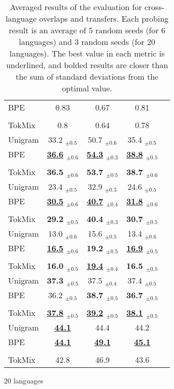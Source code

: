\begin{table*}[!htb]
\begin{subtable}[t]{.42\linewidth}
\begin{tabular}[t]{lcccc}
            BPE &              0.83 &              0.67 &              0.81 \\ \\
         TokMix &               0.8 &              0.64 &              0.78 \\
    \midrule
    Unigram &  33.2 $_{\pm0.5}$ &  50.7 $_{\pm0.6}$ &  35.4 $_{\pm0.5}$ \\
            BPE &  \bf{\underline{36.6}} $_{\pm0.6}$ &  \bf{\underline{54.3}} $_{\pm0.3}$ &  \bf{\underline{38.8}} $_{\pm0.5}$ \\ \\
            TokMix &  \bf{36.5} $_{\pm0.6}$ &  \bf{53.7} $_{\pm0.5}$ &  \bf{38.7} $_{\pm0.6}$ \\ 
    \cline{1-4}
    Unigram &  23.4 $_{\pm0.5}$ &  32.9 $_{\pm0.3}$ &  24.6 $_{\pm0.5}$ \\
            BPE &  \bf{\underline{30.5}} $_{\pm0.6}$ &  \bf{\underline{40.7}} $_{\pm0.4}$ &  \bf{\underline{31.8}} $_{\pm0.6}$ \\ \\
            TokMix &  \bf{29.2} $_{\pm0.5}$ &  \bf{40.4} $_{\pm0.3}$ &  \bf{30.7} $_{\pm0.5}$ \\ 
    \cline{1-4}
    Unigram &  13.0 $_{\pm0.6}$ &  15.6 $_{\pm0.5}$ &  13.4 $_{\pm0.6}$ \\
            BPE &  \bf{\underline{16.5}} $_{\pm0.6}$ &  \bf{19.2} $_{\pm0.5}$ &  \bf{\underline{16.9}} $_{\pm0.5}$ \\ \\
            TokMix &  \bf{16.0} $_{\pm0.5}$ &  \bf{\underline{19.4}} $_{\pm0.4}$ &  \bf{16.5} $_{\pm0.5}$ \\
    \midrule
    Unigram &  \bf{37.3} $_{\pm0.5}$ &  37.5 $_{\pm0.4}$ &  37.4 $_{\pm0.5}$ \\
            BPE &  36.2 $_{\pm0.5}$ &  \bf{38.7} $_{\pm0.5}$ &  \bf{36.7} $_{\pm0.5}$ \\ \\
            TokMix &  \bf{\underline{37.8}} $_{\pm0.5}$ &  \bf{\underline{39.2}} $_{\pm0.5}$ &  \bf{\underline{38.1}} $_{\pm0.5}$ \\
    \cline{1-4}
    Unigram &              \bf{\underline{44.1}} &              44.4 &              44.2 \\
            BPE &              \bf{\underline{44.1}} &              \bf{\underline{49.1}} &              \bf{\underline{45.1}} \\ \\
            TokMix &              42.8 &              46.9 &              43.6 \\
    \bottomrule
    \end{tabular}
    \caption{20 languages}
    \label{tab:X_lang_20L}
\end{subtable}
\caption{Averaged results of the evaluation for cross-language overlaps and transfers.  Each probing result is an average of 5 random seeds (for 6 languages) and 3 random seeds (for 20 languages). The best value in each metric is underlined, and bolded results are closer than the sum of standard deviations from the optimal value. }
\end{table*}






